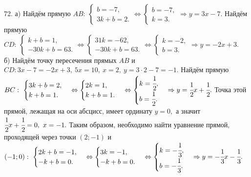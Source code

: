 72. а) Найдём прямую $AB:\ \begin{cases} b=-7,\\ 3k+b=2.\end{cases}\Leftrightarrow\begin{cases} b=-7,\\ k=3.\end{cases}\Rightarrow y=3x-7.$
Найдём прямую $CD:\ \begin{cases} k+b=1,\\ -30k+b=63.\end{cases}\Leftrightarrow\begin{cases} 31k=-62,\\ -30k+b=63.\end{cases}
\Leftrightarrow\begin{cases} k=-2,\\ b=3.\end{cases}\Rightarrow y=-2x+3.$\\
б) Найдём точку пересечения прямых $AB$ и $CD: 3x-7=-2x+3,\ 5x=10,\ x=2,\ y=3\cdot2-7=-1.$ Найдём прямую $BC:\ \begin{cases} 3k+b=2,\\ k+b=1.\end{cases}\Leftrightarrow\begin{cases} 2k=1,\\ k+b=1.\end{cases}\Leftrightarrow\begin{cases} k=\cfrac{1}{2},\\ b=\cfrac{1}{2}.\end{cases}\Rightarrow y=\cfrac{1}{2}x+\cfrac{1}{2}.$ Точка этой прямой, лежащая на оси абсцисс, имеет ординату $y=0,$ а значит $\cfrac{1}{2}x+\cfrac{1}{2}=0,\ x=-1.$ Таким образом, необходимо найти уравнение прямой, проходящей через точки $(2;-1)$ и $(-1;0): \ \begin{cases} 2k+b=-1,\\ -k+b=0.\end{cases}\Leftrightarrow\begin{cases} 3k=-1,\\ -k+b=0.\end{cases}\Leftrightarrow\begin{cases} k=-\cfrac{1}{3},\\ b=-\cfrac{1}{3}.\end{cases}\Rightarrow y=-\cfrac{1}{3}x-\cfrac{1}{3}.$\\
